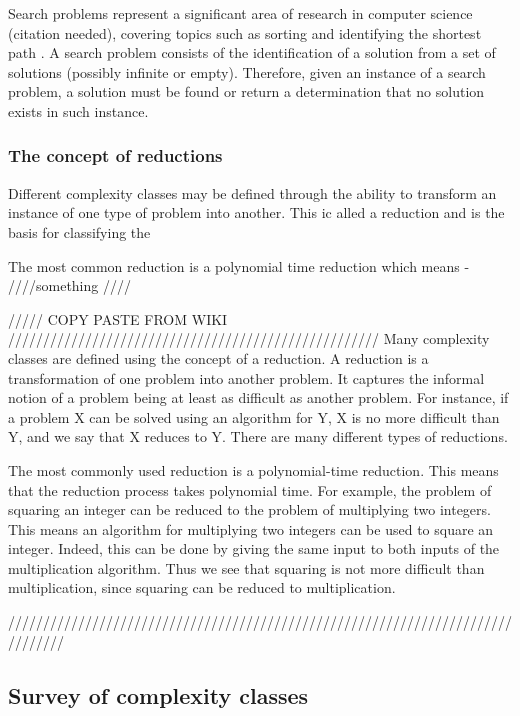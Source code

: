 \documentclass[11pt, a4paper, oneside]{report} %
\begin{document}
Search problems represent a significant area of research in computer science
(citation needed), covering topics such as sorting and identifying the shortest
path \cite{Goldreich:2008}. A search problem consists of the identification of a
solution from a set of solutions (possibly infinite or empty). Therefore, given
an instance of a search problem, a solution must be found or return a
determination that no solution exists in such instance.


\subsubsection{The concept of reductions}

Different complexity classes may be defined through the ability to transform an
instance of one type of problem into another. This ic alled a reduction and is
the basis for classifying the 

The most common reduction is a polynomial time reduction which means - ////something ////



///// COPY PASTE FROM WIKI /////////////////////////////////////////////////////
Many complexity classes are defined using the concept of a reduction. A
reduction is a transformation of one problem into another problem. It captures
the informal notion of a problem being at least as difficult as another problem.
For instance, if a problem X can be solved using an algorithm for Y, X is no
more difficult than Y, and we say that X reduces to Y. There are many different
types of reductions. 

The most commonly used reduction is a polynomial-time reduction. This means that
the reduction process takes polynomial time. For example, the problem of
squaring an integer can be reduced to the problem of multiplying two integers.
This means an algorithm for multiplying two integers can be used to square an
integer. Indeed, this can be done by giving the same input to both inputs of the
multiplication algorithm. Thus we see that squaring is not more difficult than
multiplication, since squaring can be reduced to multiplication.

////////////////////////////////////////////////////////////////////////////////

\subsection{Survey of complexity classes}
\end{document}

